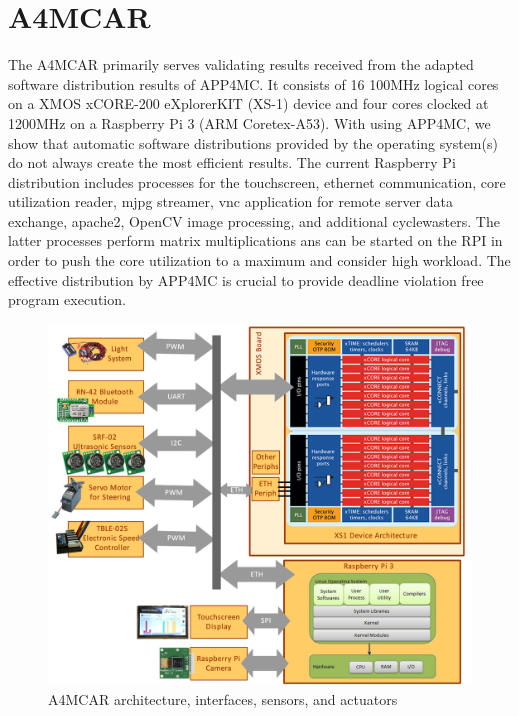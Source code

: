 \documentclass [a4paper,final,conference,10pt]{IDAACS}
\begin{document}
\section{A4MCAR}
\label{sec:rccar}
The A4MCAR primarily serves validating results received from the adapted software distribution results of APP4MC. It consists of 16 100MHz logical cores on a XMOS xCORE-200 eXplorerKIT (XS-1) device and
four cores clocked at 1200MHz on a Raspberry Pi 3 (ARM Coretex-A53). With using APP4MC, we show that automatic software distributions provided by the operating system(s) do not always create the most efficient results.
The current Raspberry Pi distribution includes processes for the touchscreen, ethernet communication, core utilization reader, mjpg streamer, vnc application for remote server data exchange, apache2, OpenCV\cite{opencv} image processing, and additional cyclewasters. The latter processes perform matrix multiplications ans can be started on the RPI in order to push the core utilization to a maximum and consider high workload. The effective distribution by APP4MC is crucial to provide deadline violation free program execution. 
\begin{figure}[h!]
	\centering
	\includegraphics[scale=0.1]{images/hwarch.png}
	\caption{\label{fig:arch}A4MCAR architecture, interfaces, sensors, and actuators}
\end{figure}
\end{document}
